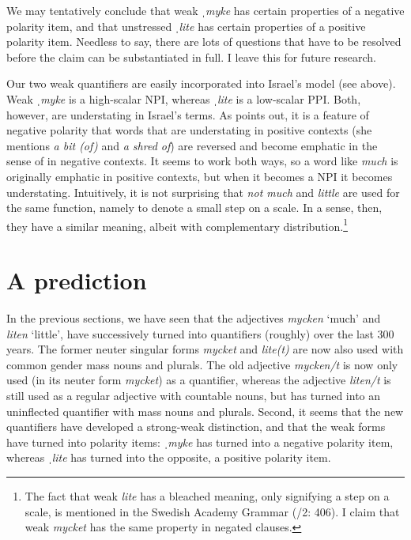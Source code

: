 \documentclass[output=paper]{langscibook}
\begin{document}
We may tentatively conclude that weak \textit{ˌmyke} has certain properties of a negative polarity item, and that unstressed \textit{ˌlite} has certain properties of a positive polarity item. Needless to say, there are lots of questions that have to be resolved before the claim can be substantiated in full. I leave this for future research.



Our two weak quantifiers are easily incorporated into Israel’s model (see  above). Weak \textit{ˌmyke} is a high-scalar NPI, whereas \textit{ˌlite} is a low-scalar PPI. Both, however, are understating in Israel’s terms. As \citet[51]{Traugott2010} points out, it is a feature of negative polarity that words that are understating in positive contexts (she mentions \textit{a bit (of)} and \textit{a shred of}) are reversed and become emphatic in the sense of \citet{Israel1996} in negative contexts. It seems to work both ways, so a word like \textit{much} is originally emphatic in positive contexts, but when it becomes a NPI it becomes understating. Intuitively, it is not surprising that \textit{not much} and \textit{little} are used for the same function, namely to denote a small step on a scale. In a sense, then, they have a similar meaning, albeit with complementary distribution.\footnote{The fact that weak \textit{lite} has a bleached meaning, only signifying a step on a scale, is mentioned in the Swedish Academy Grammar (\citealt{TelemanEtAl1999}/2: 406). I claim that weak \textit{mycket} has the same property in negated clauses.}


\section{A prediction}\label{sec:delsing:6}


In the previous sections, we have seen that the adjectives \textit{mycken} ‘much’ and \textit{liten} ‘little’, have successively turned into quantifiers (roughly) over the last 300 years. The former neuter singular forms \textit{mycket} and \textit{lite(t)} are now also used with common gender mass nouns and plurals. The old adjective \textit{mycken/t} is now only used (in its neuter form \textit{mycket}) as a quantifier, whereas the adjective \textit{liten/t} is still used as a regular adjective with countable nouns, but has turned into an uninflected quantifier with mass nouns and plurals. Second, it seems that the new quantifiers have developed a strong-weak distinction, and that the weak forms have turned into polarity items: \textit{ˌmyke} has turned into a negative polarity item, whereas \textit{ˌlite} has turned into the opposite, a positive polarity item.
\end{document}
